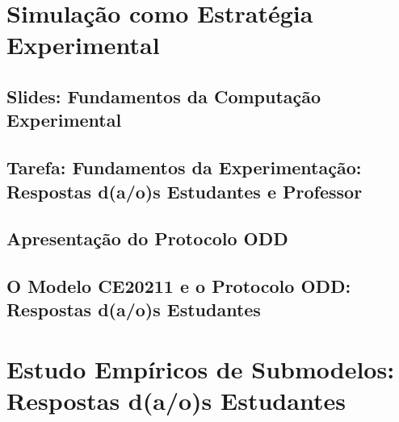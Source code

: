 \documentclass[12pt]{book}
\begin{document}


\part{Simulação como Estratégia Experimental\label{part:simulacao:estrategia}}

\chapter{Slides: Fundamentos da Computação Experimental\label{fundamentos:ce}}



\chapter{Tarefa: Fundamentos da Experimentação: Respostas d(a/o)s Estudantes e Professor}





%

%

\chapter{Apresentação do Protocolo ODD\label{oddprotocol}}
	
%

\chapter{O Modelo CE20211 e o Protocolo ODD: Respostas d(a/o)s Estudantes}

%

%    

\part{Estudo Empíricos de Submodelos: Respostas d(a/o)s Estudantes\label{part:submodelos:empiricos}}
\end{document}
